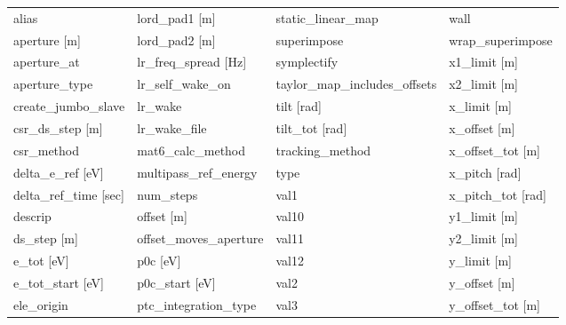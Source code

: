  \begin{tabular}{llll} \toprule
alias                            & lord_pad1 [m]                    & static_linear_map                & wall                             \\
aperture [m]                     & lord_pad2 [m]                    & superimpose                      & wrap_superimpose                 \\
aperture_at                      & lr_freq_spread [Hz]              & symplectify                      & x1_limit [m]                     \\
aperture_type                    & lr_self_wake_on                  & taylor_map_includes_offsets      & x2_limit [m]                     \\
create_jumbo_slave               & lr_wake                          & tilt [rad]                       & x_limit [m]                      \\
csr_ds_step [m]                  & lr_wake_file                     & tilt_tot [rad]                   & x_offset [m]                     \\
csr_method                       & mat6_calc_method                 & tracking_method                  & x_offset_tot [m]                 \\
delta_e_ref [eV]                 & multipass_ref_energy             & type                             & x_pitch [rad]                    \\
delta_ref_time [sec]             & num_steps                        & val1                             & x_pitch_tot [rad]                \\
descrip                          & offset [m]                       & val10                            & y1_limit [m]                     \\
ds_step [m]                      & offset_moves_aperture            & val11                            & y2_limit [m]                     \\
e_tot [eV]                       & p0c [eV]                         & val12                            & y_limit [m]                      \\
e_tot_start [eV]                 & p0c_start [eV]                   & val2                             & y_offset [m]                     \\
ele_origin                       & ptc_integration_type             & val3                             & y_offset_tot [m]                 \\

\end{tabular}
